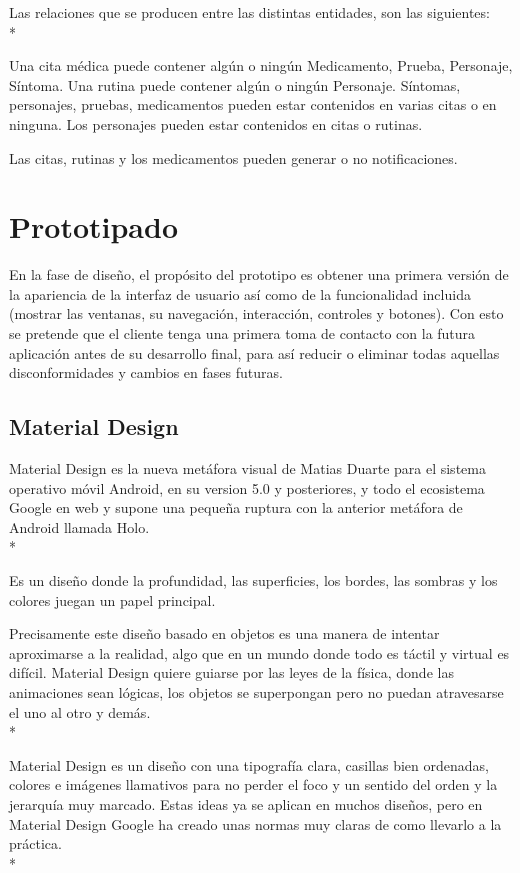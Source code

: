 \documentclass[../pfc.tex]{subfiles}
\begin{document}
		Las relaciones que se producen entre las distintas entidades, son las siguientes:\\*
		
		Una cita médica puede contener algún o ningún Medicamento, Prueba, Personaje, Síntoma.
		Una rutina puede contener algún o ningún Personaje.
		Síntomas, personajes, pruebas, medicamentos pueden estar contenidos en varias citas o en ninguna.
		Los personajes pueden estar contenidos en citas o rutinas.
		
		Las citas, rutinas y los medicamentos pueden generar o no notificaciones.
		
		
	
	\section{Prototipado}
	
	En la fase de diseño, el propósito del prototipo es obtener una primera versión de la apariencia de la interfaz de usuario así como de la funcionalidad incluida (mostrar las ventanas, su navegación, interacción, controles y botones). Con esto se pretende que el cliente tenga una primera toma de contacto con la futura aplicación antes de su desarrollo final, para así reducir o eliminar todas aquellas disconformidades y cambios en fases futuras.
	
		\subsection{Material Design}
		Material Design es la nueva metáfora visual de Matias Duarte para el sistema operativo móvil Android, en su version 5.0 y posteriores, y todo el ecosistema Google en web y supone una pequeña ruptura con la anterior metáfora de Android llamada Holo. \\*
		
		Es un diseño donde la profundidad, las superficies, los bordes, las sombras y los colores juegan un papel principal.
		
		Precisamente este diseño basado en objetos es una manera de intentar aproximarse a la realidad, algo que en un mundo donde todo es táctil y virtual es difícil. Material Design quiere guiarse por las leyes de la física, donde las animaciones sean lógicas, los objetos se superpongan pero no puedan atravesarse el uno al otro y demás.\\*
		
		Material Design es un diseño con una tipografía clara, casillas bien ordenadas, colores e imágenes llamativos para no perder el foco y un sentido del orden y la jerarquía muy marcado. Estas ideas ya se aplican en muchos diseños, pero en Material Design Google ha creado unas normas muy claras de como llevarlo a la práctica.\\*
		
\end{document}
